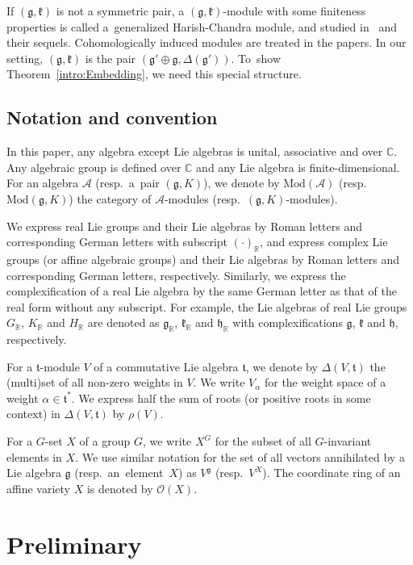 \documentclass[10pt,a4paper]{amsart}
\numberwithin{equation}{section}
\theoremstyle{definition}
\newcommand{\BasicRing}[1]{\mathbb{#1}}
\newcommand{\RR}{\BasicRing{R}}
\newcommand{\CC}{\BasicRing{C}}
\newcommand{\Mod}{\mathrm{Mod}}
\newcommand{\alg}[1]{\mathcal{#1}}
\newcommand{\lie}[1]{\mathfrak{#1}}
\newcommand{\regular}{\mathcal{O}}
\newcommand{\rring}[1]{\regular(#1)}
\newcommand{\rhog}[1]{\rho(#1)}
\begin{document}
If $(\lie{g}, \lie{k})$ is not a symmetric pair, a $(\lie{g}, \lie{k})$-module with some finiteness properties is called a~generalized Harish-Chandra module, and studied in~\cite{PeZu04_generalized_harish_chandra,PeZu04_generalized_harish_chandra2} and their sequels.
Cohomologically induced modules are treated in the papers.
In our setting, $(\lie{g}, \lie{k})$ is the pair $(\lie{g'\oplus g}, \Delta(\lie{g'}))$.
To~show Theorem~\ref{intro:Embedding}, we need this special structure.

\subsection*{Notation and convention}

In this paper, any algebra except Lie algebras is unital, associative and over $\CC$.
Any algebraic group is defined over $\CC$ and any Lie algebra is finite-dimensional.
For an algebra $\alg{A}$ (resp.\ a~pair $(\lie{g}, K)$), we denote by $\Mod(\alg{A})$ (resp.\ $\Mod(\lie{g}, K)$) the category of $\alg{A}$-modules (resp.\ \mbox{$(\lie{g}, K)$-modules}).

We express real Lie groups and their Lie algebras by Roman letters and corresponding German letters with subscript $(\cdot)_\RR$, and express complex Lie groups (or affine algebraic groups) and their Lie algebras by Roman letters and corresponding German letters, respectively.
Similarly, we express the complexification of a real Lie algebra by the same German letter as that of the real form without any subscript.
For example, the Lie algebras of real Lie groups $G_\RR$, $K_\RR$ and $H_\RR$ are denoted as $\lie{g}_\RR$, $\lie{k}_\RR$ and $\lie{h}_\RR$ with complexifications $\lie{g}$, $\lie{k}$ and $\lie{h}$, respectively.

For a $\lie{t}$-module $V$ of a commutative Lie algebra $\lie{t}$, we denote by $\Delta(V, \lie{t})$ the (multi)set of all non-zero weights in $V$.
We write $V_\alpha$ for the weight space of a weight $\alpha \in \lie{t}^*$.
We express half the sum of roots (or positive roots in some context) in $\Delta(V, \lie{t})$ by $\rhog{V}$.

For a $G$-set $X$ of a group $G$, we write $X^G$ for the subset of all $G$-invariant elements in $X$.
We use similar notation for the set of all vectors annihilated by a Lie algebra $\lie{g}$ (resp.\ an~element~$X$) as $V^{\lie{g}}$ \big(resp.\ $V^X$\big).
The coordinate ring of an affine variety $X$ is denoted by $\rring{X}$.


\section{Preliminary}
\end{document}
